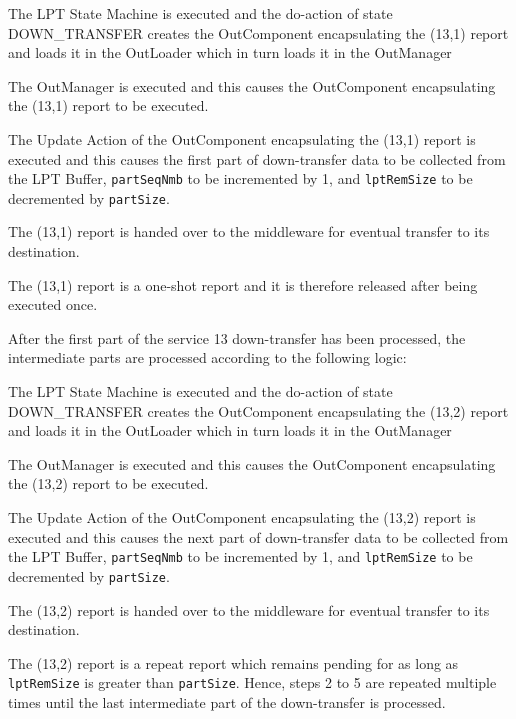 \documentclass{pnp_article}
\begin{document}
\begin{fw_enumerate}
\item The LPT State Machine is executed and the do-action of state DOWN\_TRANSFER creates the OutComponent encapsulating the (13,1) report and loads it in the OutLoader which in turn loads it in the OutManager
\item The OutManager is executed and this causes the OutComponent encapsulating the (13,1) report to be executed.
\item The Update Action of the OutComponent encapsulating the (13,1) report is executed and this causes the first part of down-transfer data to be collected from the LPT Buffer, \texttt{partSeqNmb} to be incremented by 1, and \texttt{lptRemSize} to be decremented by \texttt{partSize}.
\item The (13,1) report is handed over to the middleware for eventual transfer to its destination.
\item The (13,1) report is a one-shot report and it is therefore released after being executed once.
\end{fw_enumerate}

After the first part of the service 13 down-transfer has been processed, the intermediate parts are processed according to the following logic:

\begin{fw_enumerate}
\item The LPT State Machine is executed and the do-action of state DOWN\_TRANSFER creates the OutComponent encapsulating the (13,2) report and loads it in the OutLoader which in turn loads it in the OutManager
\item The OutManager is executed and this causes the OutComponent encapsulating the (13,2) report to be executed.
\item The Update Action of the OutComponent encapsulating the (13,2) report is executed and this causes the next part of down-transfer data to be collected from the LPT Buffer, \texttt{partSeqNmb} to be incremented by 1, and \texttt{lptRemSize} to be decremented by \texttt{partSize}.
\item The (13,2) report is handed over to the middleware for eventual transfer to its destination.
\item The (13,2) report is a repeat report which remains pending for as long as \texttt{lptRemSize} is greater than \texttt{partSize}. Hence, steps 2 to 5 are repeated multiple times until the last intermediate part of the down-transfer is processed.
\end{fw_enumerate}
\end{document}
